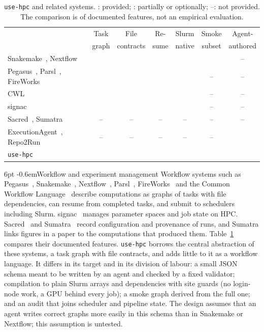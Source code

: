 \documentclass[pdflatex,sn-mathphys-num]{sn-jnl}
\makeatletter
\theoremstyle{thmstyletwo}%
\theoremstyle{thmstylethree}%
\newcommand{\tool}{\texttt{use-hpc}}
\newcommand{\cmark}{\ding{51}}
\newcommand{\pmark}{\ding{109}}
\renewcommand\paragraph{\@startsection{paragraph}{4}{\z@}%
  {6pt \@plus 2pt \@minus 1pt}{-0.6em}{\normalfont\normalsize\bfseries}}
\makeatother
\begin{document}
\begin{table}[t]
\centering\small
\footnotesize
\caption{\tool{} and related systems. \cmark: provided; \pmark: partially or optionally; --: not provided. The comparison is of documented features, not an empirical evaluation.}\label{tab:related}
\setlength{\tabcolsep}{3pt}
\begin{tabular}{@{}>{\raggedright\arraybackslash}p{4.3cm} c c c c c c@{}}
\toprule
& Task & File & Re- & Slurm & Smoke & Agent- \\
& graph & contracts & sume & native & subset & authored \\
\midrule
Snakemake~\cite{molder2021snakemake}, Nextflow~\cite{ditommaso2017nextflow} & \cmark & \cmark & \cmark & \pmark & \pmark & -- \\
Pegasus~\cite{deelman2015pegasus}, Parsl~\cite{babuji2019parsl}, FireWorks~\cite{jain2015fireworks} & \cmark & \pmark & \cmark & \pmark & -- & -- \\
CWL~\cite{crusoe2022cwl} & \cmark & \cmark & \pmark & \pmark & -- & -- \\
signac~\cite{adorf2018signac} & \pmark & \pmark & \cmark & \pmark & -- & -- \\
Sacred~\cite{greff2017sacred}, Sumatra~\cite{davison2012sumatra} & -- & -- & -- & -- & -- & -- \\
ExecutionAgent~\cite{bouzenia2025executionagent}, Repo2Run~\cite{hu2025repo2run} & -- & -- & -- & -- & -- & \cmark \\
\tool{} & \cmark & \pmark & \cmark & \cmark & \cmark & \cmark \\
\bottomrule
\end{tabular}
\end{table}

\paragraph{Workflow and experiment management} Workflow systems such as Pegasus~\cite{deelman2015pegasus}, Snakemake~\cite{molder2021snakemake}, Nextflow~\cite{ditommaso2017nextflow}, Parsl~\cite{babuji2019parsl}, FireWorks~\cite{jain2015fireworks} and the Common Workflow Language~\cite{crusoe2022cwl} describe computations as graphs of tasks with file dependencies, can resume from completed tasks, and submit to schedulers including Slurm. signac~\cite{adorf2018signac} manages parameter spaces and job state on HPC. Sacred~\cite{greff2017sacred} and Sumatra~\cite{davison2012sumatra} record configuration and provenance of runs, and Sumatra links figures in a paper to the computations that produced them. Table~\ref{tab:related} compares their documented features. \tool{} borrows the central abstraction of these systems, a task graph with file contracts, and adds little to it as a workflow language. It differs in its target and in its division of labour: a small JSON schema meant to be written by an agent and checked by a fixed validator; compilation to plain Slurm arrays and dependencies with site guards (no login-node work, a GPU behind every job); a smoke graph derived from the full one; and an audit that joins scheduler and pipeline state. The design assumes that an agent writes correct graphs more easily in this schema than in Snakemake or Nextflow; this assumption is untested.
\end{document}
